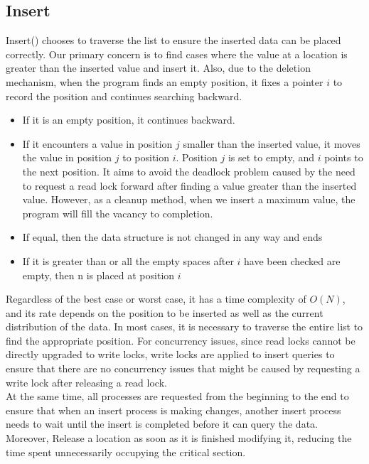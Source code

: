 \subsection{Insert}
\label{sec:Insert}
Insert() chooses to traverse the list to ensure the inserted data can be placed correctly. Our primary concern is to find cases where the value at a location is greater than the inserted value and insert it. Also, due to the deletion mechanism, when the program finds an empty position, it fixes a pointer $i$ to record the position and continues searching backward.
\begin{itemize}
    \item If it is an empty position, it continues backward.
    \item If it encounters a value in position $j$ smaller than the inserted value, it moves the value in position $j$ to position $i$. Position $j$ is set to empty, and $i$ points to the next position. It aims to avoid the deadlock problem caused by the need to request a read lock forward after finding a value greater than the inserted value. However, as a cleanup method, when we insert a maximum value, the program will fill the vacancy to completion.
    \item If equal, then the data structure is not changed in any way and ends
    \item If it is greater than or all the empty spaces after $i$ have been checked are empty, then n is placed at position $i$
\end{itemize}
Regardless of the best case or worst case, it has a time complexity of $O(N)$, and its rate depends on the position to be inserted as well as the current distribution of the data. In most cases, it is necessary to traverse the entire list to find the appropriate position.
For concurrency issues, since read locks cannot be directly upgraded to write locks, write locks are applied to insert queries to ensure that there are no concurrency issues that might be caused by requesting a write lock after releasing a read lock. \vspace{8pt}\\
At the same time, all processes are requested from the beginning to the end to ensure that when an insert process is making changes, another insert process needs to wait until the insert is completed before it can query the data. \vspace{8pt}\\
Moreover, Release a location as soon as it is finished modifying it, reducing the time spent unnecessarily occupying the critical section.


